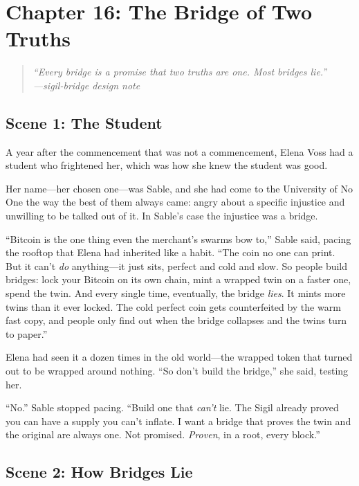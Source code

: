 \hypertarget{chapter-16-the-bridge-of-two-truths}{%
\section{Chapter 16: The Bridge of Two
Truths}\label{chapter-16-the-bridge-of-two-truths}}

\begin{quote}
\itshape ``Every bridge is a promise that two truths are one. Most bridges
lie.''\\
\normalfont\hfill---sigil-bridge design note
\end{quote}

\hypertarget{scene-1-the-student}{%
\subsection{Scene 1: The
Student}\label{scene-1-the-student}}

A year after the commencement that was not a commencement, Elena Voss had a
student who frightened her, which was how she knew the student was good.

Her name---her chosen one---was Sable, and she had come to the University of No
One the way the best of them always came: angry about a specific injustice and
unwilling to be talked out of it. In Sable's case the injustice was a bridge.

``Bitcoin is the one thing even the merchant's swarms bow to,'' Sable said,
pacing the rooftop that Elena had inherited like a habit. ``The coin no one can
print. But it can't \emph{do} anything---it just sits, perfect and cold and slow.
So people build bridges: lock your Bitcoin on its own chain, mint a wrapped twin
on a faster one, spend the twin. And every single time, eventually, the bridge
\emph{lies}. It mints more twins than it ever locked. The cold perfect coin gets
counterfeited by the warm fast copy, and people only find out when the bridge
collapses and the twins turn to paper.''

Elena had seen it a dozen times in the old world---the wrapped token that turned
out to be wrapped around nothing. ``So don't build the bridge,'' she said,
testing her.

``No.'' Sable stopped pacing. ``Build one that \emph{can't} lie. The Sigil already
proved you can have a supply you can't inflate. I want a bridge that proves the
twin and the original are always one. Not promised. \emph{Proven}, in a root,
every block.''

\hypertarget{scene-2-how-bridges-lie}{%
\subsection{Scene 2: How Bridges
Lie}\label{scene-2-how-bridges-lie}}

